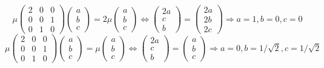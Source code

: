 \documentclass{article}
\begin{document}
\[
    \mu
  \begin{pmatrix}
    2 & 0 & 0 \\
    0 & 0 & 1 \\
    0 & 1 & 0
  \end{pmatrix}
  \begin{pmatrix}
    a \\
    b \\
    c
  \end{pmatrix}
  =2\mu
  \begin{pmatrix}
    a \\
    b \\
    c
  \end{pmatrix}
  \Leftrightarrow
  \begin{pmatrix}
     2a \\
     c \\
     b
  \end{pmatrix}
  =
  \begin{pmatrix}
    2a \\
    2b \\
    2c
  \end{pmatrix}
  \Rightarrow a=1, b=0, c=0
\]
\[
      \mu
  \begin{pmatrix}
    2 & 0 & 0 \\
    0 & 0 & 1 \\
    0 & 1 & 0
  \end{pmatrix}
  \begin{pmatrix}
    a \\
    b \\
    c
  \end{pmatrix}
  =\mu
  \begin{pmatrix}
    a \\
    b \\
    c
  \end{pmatrix}
  \Leftrightarrow
  \begin{pmatrix}
     2a \\
     c \\
     b
  \end{pmatrix}
  =
  \begin{pmatrix}
    a \\
    b \\
    c
  \end{pmatrix}
  \Rightarrow a=0, b=1/\sqrt{2}, c=1/\sqrt{2}
\]
\end{document}
